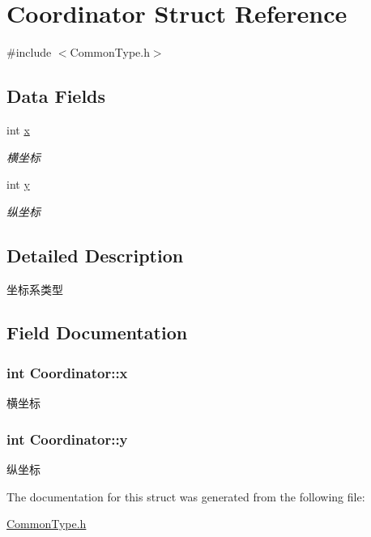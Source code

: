\hypertarget{structCoordinator}{\section{Coordinator Struct Reference}
\label{structCoordinator}
}


{\ttfamily \#include $<$Common\-Type.\-h$>$}

\subsection*{Data Fields}
\begin{DoxyCompactItemize}
\item 
int \hyperlink{structCoordinator_a457b1fc480109793f6bdfc23417b54c1}{x}
\begin{DoxyCompactList}\small\item\em 横坐标 \end{DoxyCompactList}\item 
int \hyperlink{structCoordinator_a342fba35825c82ec69bc300823bd3579}{y}
\begin{DoxyCompactList}\small\item\em 纵坐标 \end{DoxyCompactList}\end{DoxyCompactItemize}


\subsection{Detailed Description}
坐标系类型 

\subsection{Field Documentation}
\hypertarget{structCoordinator_a457b1fc480109793f6bdfc23417b54c1}{
\subsubsection[{x}]{\setlength{\rightskip}{0pt plus 5cm}int Coordinator\-::x}}\label{structCoordinator_a457b1fc480109793f6bdfc23417b54c1}


横坐标 

\hypertarget{structCoordinator_a342fba35825c82ec69bc300823bd3579}{
\subsubsection[{y}]{\setlength{\rightskip}{0pt plus 5cm}int Coordinator\-::y}}\label{structCoordinator_a342fba35825c82ec69bc300823bd3579}


纵坐标 



The documentation for this struct was generated from the following file\-:\begin{DoxyCompactItemize}
\item 
\hyperlink{CommonType_8h}{Common\-Type.\-h}\end{DoxyCompactItemize}
